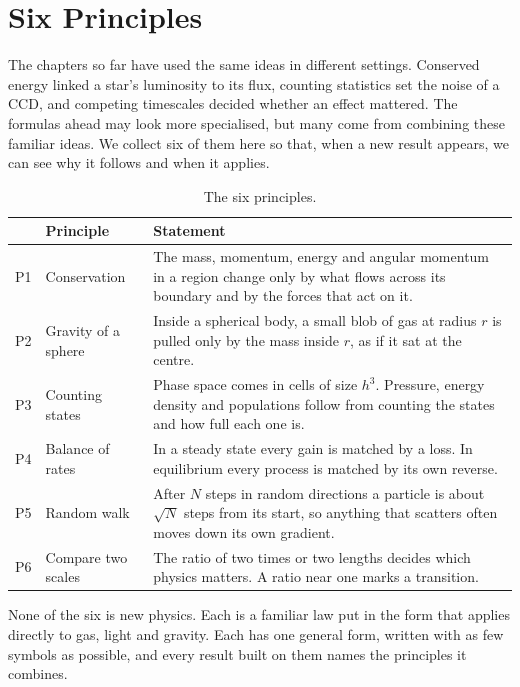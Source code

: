 \chapter{Six Principles}
\label{ch:principles}



The chapters so far have used the same ideas in different settings. Conserved energy linked a star's luminosity to its flux, counting statistics set the noise of a CCD, and competing timescales decided whether an effect mattered. The formulas ahead may look more specialised, but many come from combining these familiar ideas. We collect six of them here so that, when a new result appears, we can see why it follows and when it applies.

\begin{table}[htbp]
	\centering
	\begin{tabular}{@{}l l p{}@{}}
		\toprule
		& \textbf{Principle} & \textbf{Statement} \\
		\midrule
		P1 & Conservation & The mass, momentum, energy and angular momentum in a region change only by what flows across its boundary and by the forces that act on it. \\
		P2 & Gravity of a sphere & Inside a spherical body, a small blob of gas at radius $r$ is pulled only by the mass inside $r$, as if it sat at the centre. \\
		P3 & Counting states & Phase space comes in cells of size $h^3$. Pressure, energy density and populations follow from counting the states and how full each one is. \\
		P4 & Balance of rates & In a steady state every gain is matched by a loss. In equilibrium every process is matched by its own reverse. \\
		P5 & Random walk & After $N$ steps in random directions a particle is about $\sqrt N$ steps from its start, so anything that scatters often moves down its own gradient. \\
		P6 & Compare two scales & The ratio of two times or two lengths decides which physics matters. A ratio near one marks a transition. \\
		\bottomrule
	\end{tabular}
	\caption{The six principles.}
	\label{pr:tab:principles}
\end{table}

None of the six is new physics. Each is a familiar law put in the form that applies directly to gas, light and gravity. Each has one general form, written with as few symbols as possible, and every result built on them names the principles it combines.


